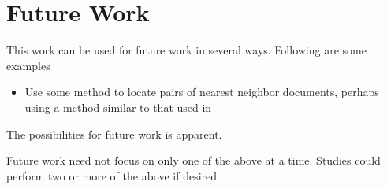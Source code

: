 \section {Future Work}
This work can be used for future work in several ways. Following are some examples 
	\begin {itemize}
		\item Use some method to locate pairs of nearest neighbor documents, perhaps using a method similar to that used in \cite{Krstovski2013efficient}
	\end {itemize}
The possibilities for future work is apparent. 

Future work need not focus on only one of the above at a time.  Studies could perform two or more of the above if desired. 
